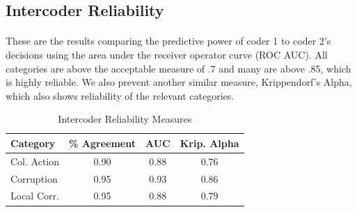 \documentclass[12pt]{article}
\begin{document}
\begin{CJK*}{UTF8}{gbsn}
\subsection*{Intercoder Reliability}

\paragraph{} These are the results comparing the predictive power of coder 1 to coder 2's decisions using the area under the receiver operator curve (ROC AUC). All categories are above the acceptable measure of .7 and many are above .85, which is highly reliable. We also prevent another similar measure, Krippendorf's Alpha, which also shows reliability of the relevant categories. 

\begin{table}[hbt!]
	\caption{Intercoder Reliability Measures}
	\label{icr}
	\centering
	\begin{tabular}{|l|c|c|c|}
		\hline
		\textbf{Category} & \textbf{\% Agreement} & \textbf{AUC} & \textbf{Krip. Alpha} \\ \hline
		Col. Action & 0.90 & 0.88 & 0.76 \\ \hline
		Corruption & 0.95 & 0.93 & 0.86 \\ \hline
		Local Corr. & 0.95 & 0.88 & 0.79 \\ \hline

\end{tabular}
\end{table}
\end{CJK*}
\end{document}
